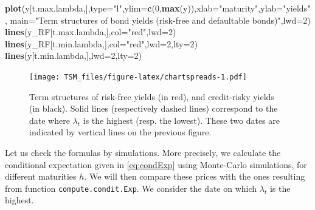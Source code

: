 \documentclass[
  12pt,
]{book}
\newenvironment{Shaded}{\begin{snugshade}}{\end{snugshade}}
\newcommand{\AttributeTok}[1]{\textcolor[rgb]{0.13,0.29,0.53}{#1}}
\newcommand{\DecValTok}[1]{\textcolor[rgb]{0.00,0.00,0.81}{#1}}
\newcommand{\FunctionTok}[1]{\textcolor[rgb]{0.13,0.29,0.53}{\textbf{#1}}}
\newcommand{\NormalTok}[1]{#1}
\newcommand{\StringTok}[1]{\textcolor[rgb]{0.31,0.60,0.02}{#1}}
\theoremstyle{definition}
\theoremstyle{definition}
\theoremstyle{definition}
\theoremstyle{definition}
\theoremstyle{remark}
\begin{document}
\begin{Shaded}
\begin{Highlighting}[]
\FunctionTok{plot}\NormalTok{(y[t.max.lambda,],}\AttributeTok{type=}\StringTok{"l"}\NormalTok{,}\AttributeTok{ylim=}\FunctionTok{c}\NormalTok{(}\DecValTok{0}\NormalTok{,}\FunctionTok{max}\NormalTok{(y)),}\AttributeTok{xlab=}\StringTok{"maturity"}\NormalTok{,}\AttributeTok{ylab=}\StringTok{"yields"}\NormalTok{,}
     \AttributeTok{main=}\StringTok{"Term structures of bond yields (risk{-}free and defaultable bonds)"}\NormalTok{,}\AttributeTok{lwd=}\DecValTok{2}\NormalTok{)}
\FunctionTok{lines}\NormalTok{(y\_RF[t.max.lambda,],}\AttributeTok{col=}\StringTok{"red"}\NormalTok{,}\AttributeTok{lwd=}\DecValTok{2}\NormalTok{)}
\FunctionTok{lines}\NormalTok{(y\_RF[t.min.lambda,],}\AttributeTok{col=}\StringTok{"red"}\NormalTok{,}\AttributeTok{lwd=}\DecValTok{2}\NormalTok{,}\AttributeTok{lty=}\DecValTok{2}\NormalTok{)}
\FunctionTok{lines}\NormalTok{(y[t.min.lambda,],}\AttributeTok{lwd=}\DecValTok{2}\NormalTok{,}\AttributeTok{lty=}\DecValTok{2}\NormalTok{)}
\end{Highlighting}
\end{Shaded}

\begin{figure}
\centering
\texttt{[image: TSM\_files/figure-latex/chartspreads-1.pdf]}
\caption{\label{fig:chartspreads}Term structures of risk-free yields (in red), and credit-risky yields (in black). Solid lines (respectively dashed lines) correspond to the date where \(\lambda_t\) is the highest (resp. the lowest). These two dates are indicated by vertical lines on the previous figure.}
\end{figure}

Let us check the formulas by simulations. More precisely, we calculate the conditional expectation given in \eqref{eq:condExp} using Monte-Carlo simulations, for different maturities \(h\). We will then compare these prices with the ones resulting from function \texttt{compute.condit.Exp}. We consider the date on which \(\lambda_t\) is the highest.
\end{document}
